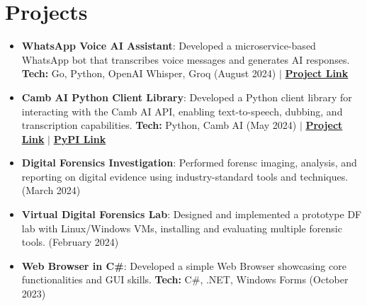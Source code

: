 \documentclass[a4paper,20pt]{article}
\newcommand{\resumeItem}[2] {
	\item\small{
		\textbf{#1}{: #2 \vspace{-2pt}}
	}
}
\newcommand{\resumeSubItem}[2]{\resumeItem{#1}{#2}\vspace{-3pt}}
\newcommand{\resumeSubHeadingListStart}{\begin{itemize}[leftmargin=*]}
\newcommand{\resumeSubHeadingListEnd}{\end{itemize}}
\begin{document}
\section{Projects}
	\resumeSubHeadingListStart
		\resumeSubItem{WhatsApp Voice AI Assistant}{Developed a microservice-based WhatsApp bot that transcribes voice messages and generates AI responses. \textbf{Tech:} Go, Python, OpenAI Whisper, Groq (August 2024) $\vert$ \href{https://github.com/cr2007/whatsapp-voice-ai-assistant}{\textbf{Project Link}}}
		\vspace{2pt}
		\resumeSubItem{Camb AI Python Client Library}{Developed a Python client library for interacting with the Camb AI API, enabling text-to-speech, dubbing, and transcription capabilities. \textbf{Tech:} Python, Camb AI (May 2024) $\vert$ \href{https://github.com/cr2007/cambai}{\textbf{Project Link}} $\vert$ \href{https://pypi.org/project/cambai}{\textbf{PyPI Link}}}
		\vspace{2pt}
		\resumeSubItem{Digital Forensics Investigation}{Performed forensc imaging, analysis, and reporting on digital evidence using industry-standard tools and techniques. (March 2024)}
		\vspace{2pt}
		\resumeSubItem{Virtual Digital Forensics Lab}{Designed and implemented a prototype DF lab with Linux/Windows VMs, installing and evaluating multiple forensic tools. (February 2024)}
		\vspace{2pt}
		\resumeSubItem{Web Browser in C\#}{Developed a simple Web Browser showcasing core functionalities and GUI skills. \textbf{Tech:} C\#, .NET, Windows Forms (October 2023)}
		\vspace{2pt}
	\resumeSubHeadingListEnd
\vspace{-3pt}

\end{document}
